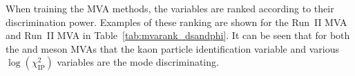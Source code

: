 When training the MVA methods, the variables are ranked according to their discrimination power. Examples of these ranking are shown for the Run~II \decay{\phiz}{\Kp\Km} MVA and Run~II \decay{\Dsp}{\Kp\Km\pip} MVA in Table~\ref{tab:mvarank_dsandphi}. It can be seen that for both the \Dsp and \phiz meson MVAs that the kaon particle identification variable and various $\log(\chi^{2}_{\text{IP}})$ variables are the mode discriminating.



